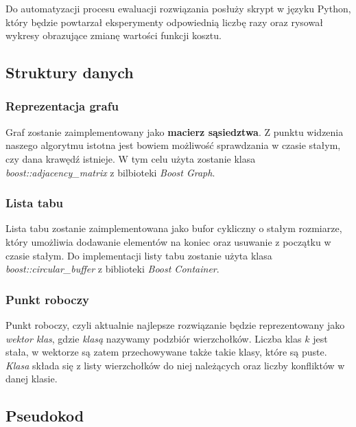 \documentclass[12pt,a4paper]{article}
\begin{document}
Do automatyzacji procesu ewaluacji rozwiązania posłuży skrypt w języku Python, który będzie powtarzał eksperymenty odpowiednią liczbę razy oraz rysował wykresy obrazujące zmianę wartości funkcji kosztu.

\subsection{Struktury danych}
\subsubsection{Reprezentacja grafu}
Graf zostanie zaimplementowany jako \textbf{macierz sąsiedztwa}. Z punktu widzenia naszego algorytmu istotna jest bowiem możliwość sprawdzania w czasie stałym, czy dana krawędź istnieje. W tym celu użyta zostanie klasa \textit{boost::adjacency\_matrix} z bilbioteki \textit{Boost Graph}.

\subsubsection{Lista tabu}
Lista tabu zostanie zaimplementowana jako bufor cykliczny o stałym rozmiarze, który umożliwia dodawanie elementów na koniec oraz usuwanie z początku w czasie stałym. Do implementacji listy tabu zostanie użyta klasa \textit{boost::circular\_buffer} z biblioteki \textit{Boost Container}.

\subsubsection{Punkt roboczy}
Punkt roboczy, czyli aktualnie najlepsze rozwiązanie będzie reprezentowany jako \textit{wektor klas}, gdzie \textit{klasą} nazywamy podzbiór wierzchołków. Liczba klas $k$ jest stała, w wektorze są zatem przechowywane także takie klasy, które są puste. \textit{Klasa} składa się z listy wierzchołków do niej należących oraz liczby konfliktów w danej klasie.

\newpage
\subsection{Pseudokod}
\end{document}
